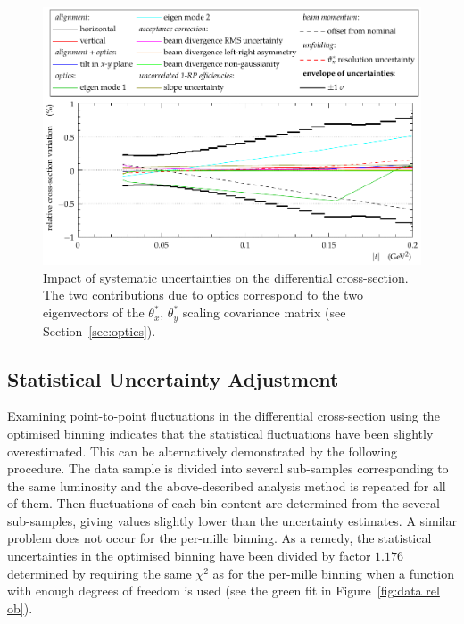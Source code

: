 \begin{figure}
\begin{center}
\includegraphics[width=15cm]{fig/direct_method_mode_cmp_presentation.pdf}
\caption{%
Impact of systematic uncertainties on the differential cross-section. The two contributions due to optics correspond to the two eigenvectors of the $\theta_x^*$, $\theta_y^*$ scaling covariance matrix (see Section~\ref{sec:optics}).
}
\label{fig:syst unc}
\end{center}
\end{figure}


\subsection{Statistical Uncertainty Adjustment}
\label{sec:stat unc adj}

Examining point-to-point fluctuations in the differential cross-section using the optimised binning indicates that the statistical fluctuations have been slightly overestimated. This can be alternatively demonstrated by the following procedure. The data sample is divided into several sub-samples corresponding to the same luminosity and the above-described analysis method is repeated for all of them. Then fluctuations of each bin content are determined from the several sub-samples, giving values slightly lower than the uncertainty estimates. A similar problem does not occur for the per-mille binning.
As a remedy, the statistical uncertainties in the optimised binning have been divided by factor $1.176$ determined by requiring the same $\chi^2$ as for the per-mille binning when a function with enough degrees of freedom is used (see the green fit in Figure~\ref{fig:data rel ob}).


